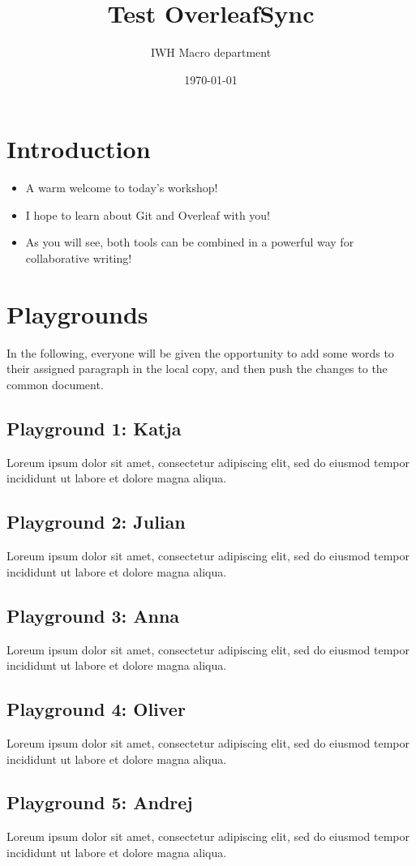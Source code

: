 \documentclass{article}
\title{Test OverleafSync}
\author{IWH Macro department}
\date{\today}
\begin{document}
\maketitle

\section{Introduction}

\begin{itemize} 
    \item A warm welcome to today's workshop!
    \item I hope to learn about Git and Overleaf with you!
    \item As you will see, both tools can be combined in a powerful way for collaborative writing!
\end{itemize}

\section{Playgrounds}
In the following, everyone will be given the opportunity to add some words to their assigned paragraph in the local copy, and then push the changes to the common document.

\subsection{Playground 1: Katja}
Loreum ipsum dolor sit amet, consectetur adipiscing elit, sed do eiusmod tempor incididunt ut labore et dolore magna aliqua.
\subsection{Playground 2: Julian}
Loreum ipsum dolor sit amet, consectetur adipiscing elit, sed do eiusmod tempor incididunt ut labore et dolore magna aliqua.
\subsection{Playground 3: Anna}
Loreum ipsum dolor sit amet, consectetur adipiscing elit, sed do eiusmod tempor incididunt ut labore et dolore magna aliqua.
\subsection{Playground 4: Oliver}
Loreum ipsum dolor sit amet, consectetur adipiscing elit, sed do eiusmod tempor incididunt ut labore et dolore magna aliqua.
\subsection{Playground 5: Andrej}
Loreum ipsum dolor sit amet, consectetur adipiscing elit, sed do eiusmod tempor incididunt ut labore et dolore magna aliqua.
\end{document}
